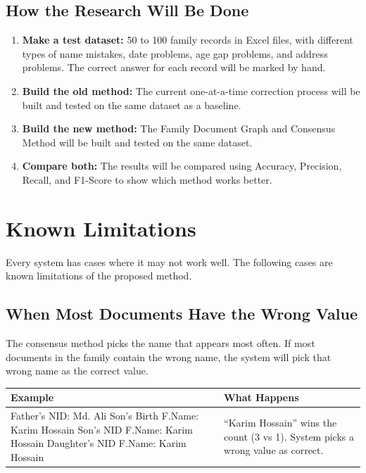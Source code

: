 \documentclass[12pt, a4paper]{article}
\begin{document}
\subsection{How the Research Will Be Done}

\begin{enumerate}
    \item \textbf{Make a test dataset:} 50 to 100 family records in Excel
          files, with different types of name mistakes, date problems, age
          gap problems, and address problems. The correct answer for each
          record will be marked by hand.

    \item \textbf{Build the old method:} The current one-at-a-time correction
          process will be built and tested on the same dataset as a baseline.

    \item \textbf{Build the new method:} The Family Document Graph and
          Consensus Method will be built and tested on the same dataset.

    \item \textbf{Compare both:} The results will be compared using Accuracy,
          Precision, Recall, and F1-Score to show which method works better.
\end{enumerate}

\section{Known Limitations}

Every system has cases where it may not work well. The following cases
are known limitations of the proposed method.

\subsection{When Most Documents Have the Wrong Value}

The consensus method picks the name that appears most often. If most
documents in the family contain the wrong name, the system will pick
that wrong name as the correct value.

\begin{center}
\begin{tabular}{|p{5.5cm}|p{5.5cm}|}
    \hline
    \textbf{Example} & \textbf{What Happens} \\
    \hline
    Father's NID: Md. Ali \newline
    Son's Birth F.Name: Karim Hossain \newline
    Son's NID F.Name: Karim Hossain \newline
    Daughter's NID F.Name: Karim Hossain &
    ``Karim Hossain'' wins the count (3 vs 1). \newline
    System picks a wrong value as correct. \\
    \hline
\end{tabular}
\end{center}
\end{document}
